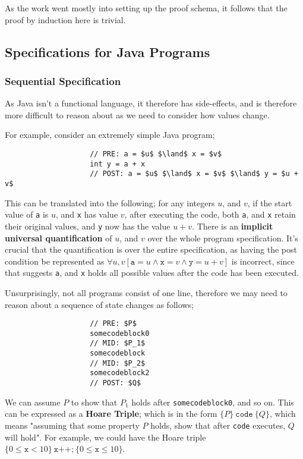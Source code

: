\documentclass[a4paper, 12pt]{article}
\begin{document}
            As the work went mostly into setting up the proof schema, it follows that the proof by induction here is trivial.
        \subsection*{Specifications for Java Programs}
            \subsubsection*{Sequential Specification}
                As Java isn't a functional language, it therefore has side-effects, and is therefore more difficult to reason about as we need to consider how values change.
                \medskip

                For example, consider an extremely simple Java program;
                \begin{lstlisting}
                    // PRE: a = $u$ $\land$ x = $v$
                    int y = a + x
                    // POST: a = $u$ $\land$ x = $v$ $\land$ y = $u + v$
                \end{lstlisting}
                This can be translated into the following; for any integers $u$, and $v$, if the start value of \texttt{a} is $u$, and \texttt{x} has value $v$, after executing the code, both \texttt{a}, and \texttt{x} retain their original values, and \texttt{y} now has the value $u + v$. There is an \textbf{implicit universal quantification} of $u$, and $v$ over the whole program specification. It's crucial that the quantification is over the entire specification, as having the post condition be represented as $\forall u, v [\texttt{a} = u \land \texttt{x} = v \land \texttt{y} = u + v]$ is incorrect, since that suggests \texttt{a}, and \texttt{x} holds all possible values after the code has been executed.
                \medskip

                Unsurprisingly, not all programs consist of one line, therefore we may need to reason about a sequence of state changes as follows;
                \begin{lstlisting}
                    // PRE: $P$
                    somecodeblock0
                    // MID: $P_1$
                    somecodeblock
                    // MID: $P_2$
                    somecodeblock2
                    // POST: $Q$
                \end{lstlisting}
                We can assume $P$ to show that $P_1$ holds after \texttt{somecodeblock0}, and so on. This can be expressed as a \textbf{Hoare Triple}; which is in the form $\{ P \}\ \texttt{code}\ \{ Q \}$, which means "assuming that some property $P$ holds, show that after \texttt{code} executes, $Q$ will hold". For example, we could have the Hoare triple $\{ 0 \leq \texttt{x} < 10 \}\ \texttt{x++;}\ \{0 \leq \texttt{x} \leq 10\}$.
                \smallskip
\end{document}
